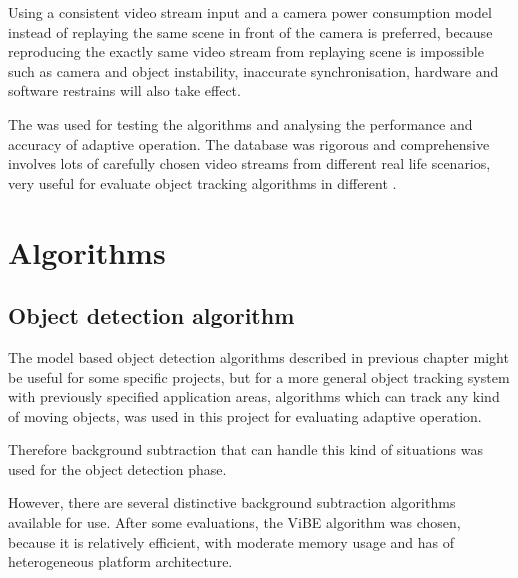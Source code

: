 Using a consistent video stream input and a camera power consumption model instead of replaying the same scene in front of the camera is preferred, because reproducing the exactly same video stream from replaying scene is impossible such as camera and object instability, inaccurate synchronisation, hardware and software restrains will also take effect.

The  \cite{goyette2012changedetection} was used for testing the algorithms and analysing the performance and accuracy of adaptive operation. The database was rigorous and comprehensive involves lots of carefully chosen video streams from different real life scenarios,  very useful for evaluate object tracking algorithms in different .

\section{Algorithms}

\subsection{Object detection algorithm}

The model based object detection algorithms described in previous chapter might be useful for some specific projects, but for a more general object tracking system with previously specified application areas,  algorithms which can track any kind of moving objects, was used in this project for evaluating adaptive operation.

 Therefore background subtraction that can handle this kind of situations was used for the object detection phase.

However, there are several distinctive background subtraction algorithms available for use. After some evaluations, the ViBE algorithm was chosen, because it is relatively efficient, with moderate memory usage and has  of heterogeneous platform architecture.

